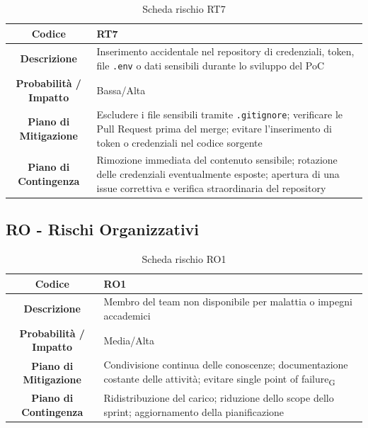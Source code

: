 \begin{table}[H]
	\centering
	\renewcommand{\arraystretch}{1.3}
	\begin{tabularx}{\textwidth}{|c|X|}
		\hline
		\textbf{Codice} & \textbf{RT7} \\
		\hline
		\textbf{Descrizione} & Inserimento accidentale nel repository di credenziali, token, file \texttt{.env} o dati sensibili durante lo sviluppo del PoC \\
		\hline
		\textbf{Probabilità / Impatto} & Bassa/Alta \\
		\hline
		\textbf{Piano di Mitigazione} & Escludere i file sensibili tramite \texttt{.gitignore}; verificare le Pull Request prima del merge; evitare l'inserimento di token o credenziali nel codice sorgente \\
		\hline
		\textbf{Piano di Contingenza} & Rimozione immediata del contenuto sensibile; rotazione delle credenziali eventualmente esposte; apertura di una issue correttiva e verifica straordinaria del repository \\
		\hline
	\end{tabularx}
	\caption{Scheda rischio RT7}
\end{table}

\subsection{RO - Rischi Organizzativi}

\begin{table}[H]
	\centering
	\renewcommand{\arraystretch}{1.3}
	\begin{tabularx}{\textwidth}{|c|X|}
		\hline
		\textbf{Codice} & \textbf{RO1} \\
		\hline
		\textbf{Descrizione} & Membro del team non disponibile per malattia o impegni accademici \\
		\hline
		\textbf{Probabilità / Impatto} & Media/Alta \\
		\hline
		\textbf{Piano di Mitigazione} & Condivisione continua delle conoscenze; documentazione costante delle attività; evitare single point of failure\textsubscript{G} \\
		\hline
		\textbf{Piano di Contingenza} & Ridistribuzione del carico; riduzione dello scope dello sprint; aggiornamento della pianificazione \\
		\hline
	\end{tabularx}
	\caption{Scheda rischio RO1}
\end{table}

